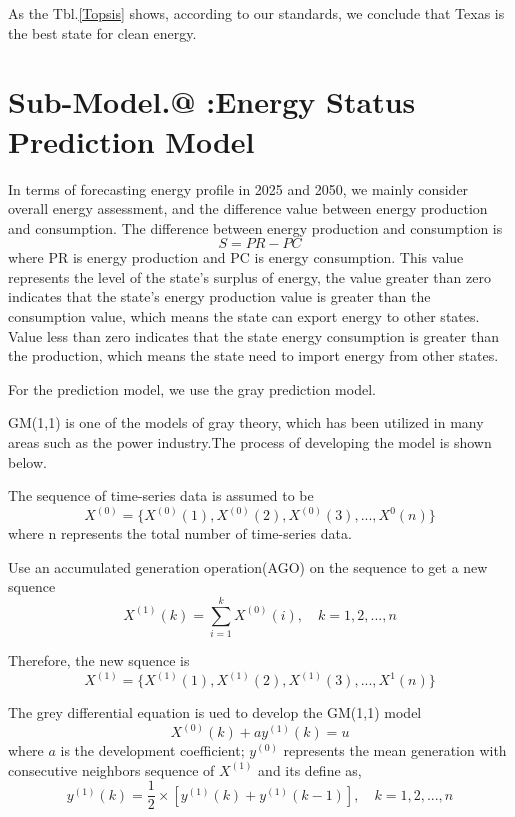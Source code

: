 \documentclass{mcmthesis}
\makeatletter
\newcommand{\Rmnum}[1]{\expandafter\@slowromancap\romannumeral #1@}
\makeatother
\begin{document}
As the Tbl.\ref{Topsis} shows, according to our standards, we conclude that Texas is the best state for clean energy.

\section{Sub-Model.\Rmnum{2} :\quad Energy Status Prediction Model}
In terms of forecasting energy profile in 2025 and 2050,  we mainly consider overall energy assessment, and the difference value between energy production and consumption. The difference between energy production and consumption is
\begin{equation}
  S = PR - PC
\end{equation}
where PR is energy production and PC is energy consumption. This value represents the level of the state's surplus of energy, the value greater than zero indicates that the state's energy production value is greater than the consumption value, which means the state can export energy to other states. Value less than zero indicates that the state energy consumption is greater than the production, which means the state need to import energy from other states.

For the prediction model, we use the gray prediction model.

GM(1,1) is one of the models of gray theory, which has been 
utilized in many areas such as the power industry\cite{}.The process of developing the model is shown below.
    
The sequence of time-series data is assumed to be
\begin{equation}
    X^{(0)}=\{X^{(0)}(1),X^{(0)}(2),X^{(0)}(3),...,X^{0}(n)\}
\end{equation}
where n represents the total number of time-series data.

    Use an accumulated generation operation(AGO) on the sequence to get a new squence
\begin{equation}
  X^{(1)}(k) = \sum^k_{i=1}X^{(0)}(i),\quad k=1,2,...,n
\end{equation}

Therefore, the new squence is
\begin{equation}
  X^{(1)}=\{X^{(1)}(1),X^{(1)}(2),X^{(1)}(3),...,X^{1}(n)\}
\end{equation}

The grey differential equation is ued to develop the GM(1,1) model
\begin{equation}
  X^{(0)}(k) + ay^{(1)}(k)=u
\end{equation}
where $a$ is the development coefficient; $y^{(0)}$ represents the 
mean generation with consecutive neighbors sequence of $X^{(1)}$ and its define as,
\begin{equation}
  y^{(1)}(k) = \frac12\times\left[y^{(1)}(k) + y^{(1)}(k-1)\right],\quad k=1,2,...,n
\end{equation}
\end{document}
